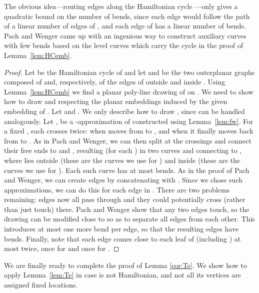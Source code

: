 \documentclass{llncs}
\begin{document}
The obvious idea---routing edges along the Hamiltonian cycle ---only gives a quadratic bound on the number of bends, since each edge would follow the path of a linear number of edges of , and each edge of  has a linear number of bends. Pach and Wenger came up with an ingenious way to construct auxiliary curves with few bends based on the level curves  which carry the cycle  in the proof of Lemma~\ref{lem:HCemb}.

\begin{proof}
 Let  be the Hamiltonian cycle of  and let  and  be the two outerplanar graphs composed of  and, respectively, of the edges of  outside and inside .  Using Lemma~\ref{lem:HCemb} we find a planar poly-line drawing of  on . We need to show how to draw  and  respecting the planar embeddings induced by the given embedding of . Let  and .
 We only describe how to draw , since  can be handled analogously. Let ,  be a -approximation of  constructed using Lemma~\ref{lem:fw}. For a fixed , each  crosses  twice: when  moves from  to , and when it finally moves back from  to . As in Pach and Wenger, we can then split  at the crossings and connect their free ends to  and , resulting (for each ) in two curves  and  connecting  to , where  lies outside  (these are the curves we use for ) and  inside  (these are the curves we use for ). Each such curve has at most  bends. As in the proof of Pach and Wenger, we can create edges  by concatenating  with . Since we chose  such approximations, we can do this for each edge in . There are two problems remaining: edges  now all pass through  and they could potentially cross (rather than just touch) there. Pach and Wenger show that any two edges touch, so the drawing can be modified close to  so as to separate all edges  from each other. This introduces at most one more bend per edge, so that the resulting edges have  bends. Finally, note that each edge  comes close to each leaf of  (including ) at most twice, once for  and once for  .
\end{proof}

We are finally ready to complete the proof of Lemma \ref{cor:Te}. We show how to apply Lemma~\ref{lem:Te} in case  is not Hamiltonian, and not all its vertices are assigned fixed locations.
\end{document}
